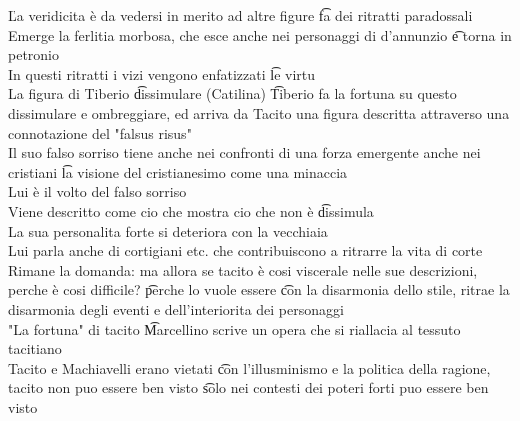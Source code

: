 \documentclass[12pt]{article}
\begin{document}
\v

La veridicita è da vedersi in merito ad altre figure \t fa dei ritratti paradossali \\
Emerge la ferlitia morbosa, che esce anche nei personaggi di d'annunzio \t e torna in petronio \\
In questi ritratti i vizi vengono enfatizzati \t le virtu \\
La figura di Tiberio \t dissimulare (Catilina) \t Tiberio fa la fortuna su questo dissimulare e ombreggiare, ed arriva da Tacito una figura descritta attraverso una connotazione del "falsus risus" \\
Il suo falso sorriso tiene anche nei confronti di una forza emergente anche nei cristiani \t la visione del cristianesimo come una minaccia \\
Lui è il volto del falso sorriso \\
Viene descritto come cio che mostra cio che non è \t dissimula \\
La sua personalita forte si deteriora con la vecchiaia \\
Lui parla anche di cortigiani etc. che contribuiscono a ritrarre la vita di corte \\
Rimane la domanda: ma allora se tacito è cosi viscerale nelle sue descrizioni, perche è cosi difficile? \t perche lo vuole essere \t con la disarmonia dello stile, ritrae la disarmonia degli eventi e dell'interiorita dei personaggi \\
"La fortuna" di tacito \t Marcellino scrive un opera che si riallacia al tessuto tacitiano \\
Tacito e Machiavelli erano vietati \t con l'illusminismo e la politica della ragione, tacito non puo essere ben visto \t solo nei contesti dei poteri forti puo essere ben visto 
\end{document}
